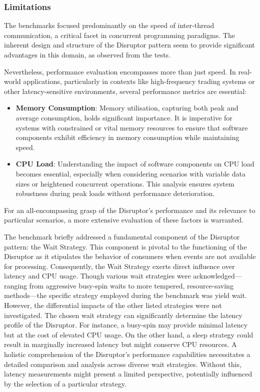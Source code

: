\documentclass{article}
\theoremstyle{break}
\begin{document}
\subsubsection*{Limitations}

The benchmarks focused predominantly on the speed of inter-thread communication, a critical facet in concurrent programming paradigms. The inherent design and structure of the Disruptor pattern seem to provide significant advantages in this domain, as observed from the tests.

\noindent Nevertheless, performance evaluation encompasses more than just speed. In real-world applications, particularly in contexts like high-frequency trading systems or other latency-sensitive environments, several performance metrics are essential:

\begin{itemize}
\item \textbf{Memory Consumption}: Memory utilisation, capturing both peak and average consumption, holds significant importance. It is imperative for systems with constrained or vital memory resources to ensure that software components exhibit efficiency in memory consumption while maintaining speed.

\item \textbf{CPU Load}: Understanding the impact of software components on CPU load becomes essential, especially when considering scenarios with variable data sizes or heightened concurrent operations. This analysis ensures system robustness during peak loads without performance deterioration.
\end{itemize}

\noindent For an all-encompassing grasp of the Disruptor's performance and its relevance to particular scenarios, a more extensive evaluation of these factors is warranted.

The benchmark briefly addressed a fundamental component of the Disruptor pattern: the Wait Strategy. This component is pivotal to the functioning of the Disruptor as it stipulates the behavior of consumers when events are not available for processing. Consequently, the Wait Strategy exerts direct influence over latency and CPU usage. Though various wait strategies were acknowledged—ranging from aggressive busy-spin waits to more tempered, resource-saving methods—the specific strategy employed during the benchmark was yield wait. However, the differential impacts of the other listed strategies were not investigated. The chosen wait strategy can significantly determine the latency profile of the Disruptor. For instance, a busy-spin may provide minimal latency but at the cost of elevated CPU usage. On the other hand, a sleep strategy could result in marginally increased latency but might conserve CPU resources. A holistic comprehension of the Disruptor's performance capabilities necessitates a detailed comparison and analysis across diverse wait strategies. Without this, latency measurements might present a limited perspective, potentially influenced by the selection of a particular strategy.
\end{document}
